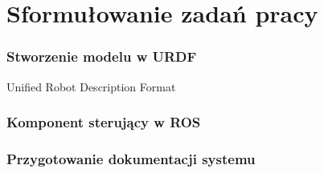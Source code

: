 \section{Sformułowanie zadań pracy}



\begin{frame}
	\frametitle{Stworzenie modelu w URDF}
	Unified Robot Description Format
\end{frame}


\begin{frame}
	\frametitle{Komponent sterujący w ROS}

\end{frame}


\begin{frame}
	\frametitle{Przygotowanie dokumentacji systemu}

\end{frame}

